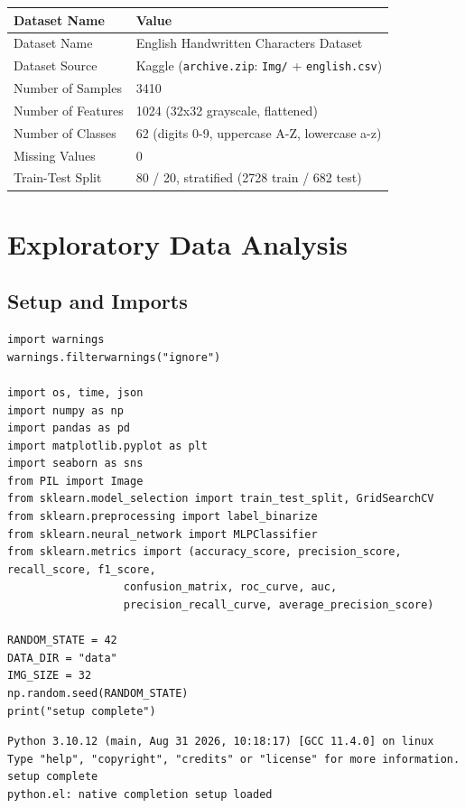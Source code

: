 \documentclass[11pt]{article}
\begin{document}
\begin{center}
\begin{tabular}{ll}
Dataset Name & Value\\
\hline
Dataset Name & English Handwritten Characters Dataset\\
Dataset Source & Kaggle (\texttt{archive.zip}: \texttt{Img/} + \texttt{english.csv})\\
Number of Samples & 3410\\
Number of Features & 1024 (32x32 grayscale, flattened)\\
Number of Classes & 62 (digits 0-9, uppercase A-Z, lowercase a-z)\\
Missing Values & 0\\
Train-Test Split & 80 / 20, stratified (2728 train / 682 test)\\
\end{tabular}
\end{center}

\section{Exploratory Data Analysis}
\label{sec:orgaca508f}

\subsection{Setup and Imports}
\label{sec:org6944686}

\begin{verbatim}
import warnings
warnings.filterwarnings("ignore")

import os, time, json
import numpy as np
import pandas as pd
import matplotlib.pyplot as plt
import seaborn as sns
from PIL import Image
from sklearn.model_selection import train_test_split, GridSearchCV
from sklearn.preprocessing import label_binarize
from sklearn.neural_network import MLPClassifier
from sklearn.metrics import (accuracy_score, precision_score, recall_score, f1_score,
			      confusion_matrix, roc_curve, auc,
			      precision_recall_curve, average_precision_score)

RANDOM_STATE = 42
DATA_DIR = "data"
IMG_SIZE = 32
np.random.seed(RANDOM_STATE)
print("setup complete")
\end{verbatim}

\begin{verbatim}
Python 3.10.12 (main, Aug 31 2026, 10:18:17) [GCC 11.4.0] on linux
Type "help", "copyright", "credits" or "license" for more information.
setup complete
python.el: native completion setup loaded
\end{verbatim}
\end{document}
